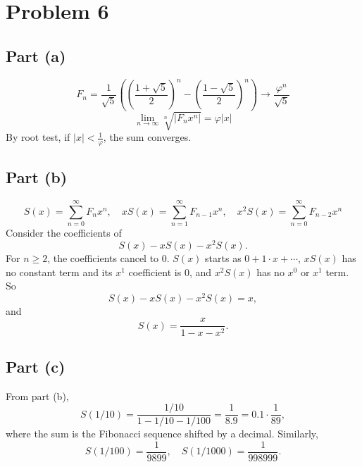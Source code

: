 \documentclass{article}
\newcommand{\bigp}[1]{\left(#1\right)}
\newcommand{\summation}[1][0]{\sum_{n=#1}^\infty}
\begin{document}
\section*{Problem 6}
\subsection*{Part (a)}
$$F_n = \frac{1}{\sqrt{5}}\bigp{\bigp{\frac{1 + \sqrt{5}}{2}}^n - \bigp{\frac{1 - \sqrt{5}}{2}}^n} \rightarrow \frac{\varphi^n}{\sqrt{5}}$$
$$\lim_{n \to \infty} \sqrt[n]{|F_nx^n|} = \varphi|x|$$
By root test, if $|x| < \frac{1}{\varphi}$, the sum converges.

\subsection*{Part (b)}
$$S(x) = \summation F_nx^n, \quad xS(x) = \summation[1] F_{n - 1}x^n, \quad x^2S(x) = \summation F_{n - 2}x^n$$
Consider the coefficients of
$$S(x) - xS(x) - x^2S(x).$$
For $n \ge 2$, the coefficients cancel to $0$. $S(x)$ starts as $0 + 1\cdot x + \cdots$, $xS(x)$ has no constant term and its $x^1$ coefficient is $0$, and $x^2S(x)$ has no $x^0$ or $x^1$ term. So
$$S(x) - xS(x) - x^2S(x) = x,$$
and
$$S(x) = \frac{x}{1 - x - x^2}.$$

\subsection*{Part (c)}
From part (b),
$$S(1/10) = \frac{1/10}{1 - 1/10 - 1/100} = \frac{1}{8.9} = 0.1 \cdot \frac{1}{89},$$
where the sum is the Fibonacci sequence shifted by a decimal.
Similarly,
$$S(1/100) = \frac{1}{9899}, \quad S(1/1000) = \frac{1}{998999}.$$
\end{document}
